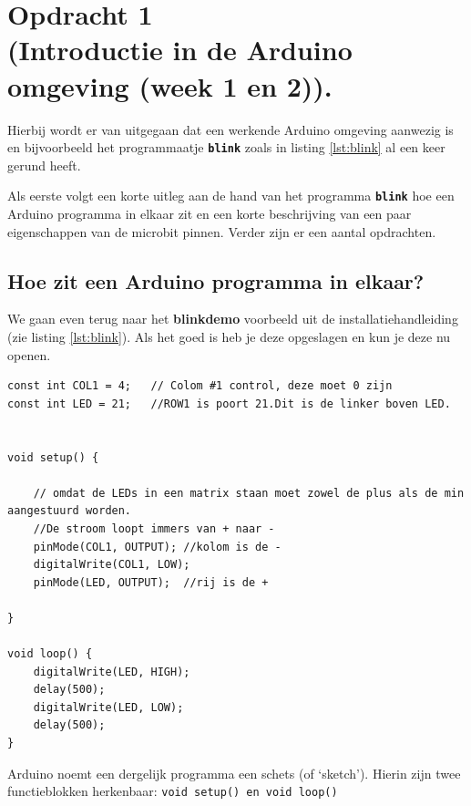 \chapter{Opdracht 1\\  \small (Introductie in de Arduino omgeving (week 1 en 2)).}
\label{chap:intr}

Hierbij wordt er van uitgegaan dat een werkende Arduino omgeving aanwezig is en bijvoorbeeld het programmaatje \texttt{\textbf{blink}} zoals in listing \ref{lst:blink} al een keer gerund heeft.


Als eerste volgt een korte uitleg aan de hand van het programma \texttt{\textbf{blink}} hoe een Arduino programma in elkaar zit en een korte beschrijving van een paar eigenschappen van de microbit pinnen. Verder zijn er een aantal opdrachten.


\section{ Hoe zit een Arduino programma in elkaar?}\label{sec:blink}

We gaan even terug naar het \textbf{blinkdemo} voorbeeld uit de installatiehandleiding (zie listing \ref{lst:blink}).  Als het goed is heb je deze opgeslagen en kun je deze nu openen.

	


\begin{lstlisting}[caption= Het programma blinkdemo,label={lst:blink},firstnumber=1]		
const int COL1 = 4;   // Colom #1 control, deze moet 0 zijn
const int LED = 21;   //ROW1 is poort 21.Dit is de linker boven LED.


void setup() {
	
	// omdat de LEDs in een matrix staan moet zowel de plus als de min aangestuurd worden.
	//De stroom loopt immers van + naar -
	pinMode(COL1, OUTPUT); //kolom is de -
	digitalWrite(COL1, LOW);
	pinMode(LED, OUTPUT);  //rij is de +
	
}

void loop() {
	digitalWrite(LED, HIGH);
	delay(500);
	digitalWrite(LED, LOW);
	delay(500);
}
\end{lstlisting}

Arduino noemt een dergelijk programma een schets (of ‘sketch’). 
Hierin zijn twee functieblokken herkenbaar: \texttt{{\textcolor{arduinoBlue}{void}} \textcolor{arduinoGreen}{setup}(){} en  \textcolor{arduinoBlue}{void} \textcolor{arduinoGreen}{loop}(){}}

